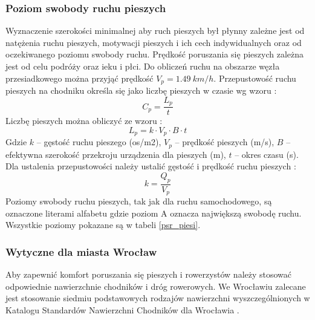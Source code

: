 \documentclass[twoside,12pt]{article}
\begin{document}
	 \subsubsection{Poziom swobody ruchu pieszych}
	 
	 Wyznaczenie szerokości minimalnej aby ruch pieszych był płynny zależne jest od natężenia ruchu pieszych, motywacji pieszych i ich cech indywidualnych oraz od oczekiwanego poziomu swobody ruchu. Prędkość poruszania się pieszych zależna jest od celu podróży oraz ieku i płci. Do obliczeń ruchu na obszarze węzła przesiadkowego można przyjąć prędkość $V_p = 1.49 \ \si{km/h}$. Przepustowość ruchu pieszych na chodniku określa się jako liczbę pieszych w czasie wg wzoru \cite{standardy_wroclaw}:
	 \begin{equation}
	 C_p = \frac{L_p}{t}
	 \end{equation}
	 Liczbę pieszych można obliczyć ze wzoru \cite{standardy_wroclaw}:
	 \begin{equation}
	 L_p = k \cdot V_p \cdot B \cdot t
	 \end{equation}
	 Gdzie $k$ -- gęstość ruchu pieszego (os/m2), $V_p$ -- prędkość pieszych (m/s), $B$ -- efektywna szerokość przekroju urządzenia dla pieszych (m), $t$ -- okres czasu (s). 
	 Dla ustalenia przepustowości należy ustalić gęstość i prędkość ruchu pieszych \cite{standardy_wroclaw}:
	 \begin{equation}
	 k=\frac{Q_p}{V_p}
	 \end{equation}
	 Poziomy swobody ruchu pieszych, tak jak dla ruchu samochodowego, są oznaczone literami alfabetu gdzie poziom A oznacza największą swobodę ruchu. Wszystkie poziomy pokazane są w tabeli \ref{psr_piesi}.
	 
	 
	 \subsubsection{Wytyczne dla miasta Wrocław}
	 
	 Aby zapewnić komfort poruszania się pieszych i rowerzystów należy stosować odpowiednie nawierzchnie chodników i dróg rowerowych. We Wrocławiu zalecane jest stosowanie siedmiu podstawowych rodzajów nawierzchni wyszczególnionych w Katalogu Standardów Nawierzchni Chodników dla Wrocławia \cite{standardy_chodnik}.
\end{document}
